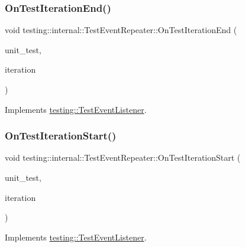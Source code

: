 \subsubsection{\texorpdfstring{OnTestIterationEnd()}{OnTestIterationEnd()}}
{\footnotesize\ttfamily void testing\+::internal\+::\+Test\+Event\+Repeater\+::\+On\+Test\+Iteration\+End (\begin{DoxyParamCaption}\item[{const \mbox{\hyperlink{classtesting_1_1UnitTest}{Unit\+Test}} \&}]{unit\+\_\+test,  }\item[{int}]{iteration }\end{DoxyParamCaption})\hspace{0.3cm}{\ttfamily [virtual]}}



Implements \mbox{\hyperlink{classtesting_1_1TestEventListener_a550fdb3e55726e4cefa09f5697941425}{testing\+::\+Test\+Event\+Listener}}.

\mbox{\label{classtesting_1_1internal_1_1TestEventRepeater_a4062b3f070bb6531ab8494c13d3635d3}} 
\subsubsection{\texorpdfstring{OnTestIterationStart()}{OnTestIterationStart()}}
{\footnotesize\ttfamily void testing\+::internal\+::\+Test\+Event\+Repeater\+::\+On\+Test\+Iteration\+Start (\begin{DoxyParamCaption}\item[{const \mbox{\hyperlink{classtesting_1_1UnitTest}{Unit\+Test}} \&}]{unit\+\_\+test,  }\item[{int}]{iteration }\end{DoxyParamCaption})\hspace{0.3cm}{\ttfamily [virtual]}}



Implements \mbox{\hyperlink{classtesting_1_1TestEventListener_a60cc09b7907cb329d152eb5e7133bdeb}{testing\+::\+Test\+Event\+Listener}}.

\mbox{\label{classtesting_1_1internal_1_1TestEventRepeater_ac8fb21da6802b1ebab9cad3eee9150eb}} 
